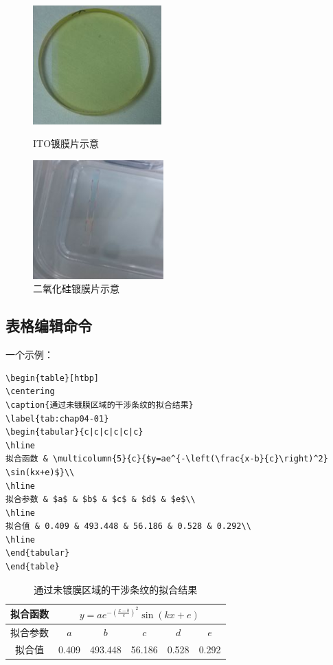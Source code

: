 \documentclass[onecolumn,a4paper,10pt]{article}
\begin{document}
\begin{figure}[htbp]
\begin{minipage}[t]{0.5\linewidth}
\centering
\includegraphics[height=1.8in]{pict04-01}
\caption{ITO镀膜片示意}
\label{fig:pict04-01}
\end{minipage}%
\begin{minipage}[t]{0.5\linewidth}
\centering
\includegraphics[height=1.8in]{pict04-02}
\caption{二氧化硅镀膜片示意}
\label{fig:pict04-02}
\end{minipage}
\end{figure}

\subsection{表格编辑命令}
一个示例：
\begin{verbatim}
\begin{table}[htbp]
\centering
\caption{通过未镀膜区域的干涉条纹的拟合结果}
\label{tab:chap04-01}
\begin{tabular}{c|c|c|c|c|c}
\hline
拟合函数 & \multicolumn{5}{c}{$y=ae^{-\left(\frac{x-b}{c}\right)^2} \sin(kx+e)$}\\
\hline
拟合参数 & $a$ & $b$ & $c$ & $d$ & $e$\\
\hline
拟合值 & 0.409 & 493.448 & 56.186 & 0.528 & 0.292\\
\hline
\end{tabular}
\end{table}
\end{verbatim}

\begin{table}[htbp]
\centering
\caption{通过未镀膜区域的干涉条纹的拟合结果}
\label{tab:chap04-01}
\begin{tabular}{c|c|c|c|c|c}
\hline
拟合函数 & \multicolumn{5}{c}{$y=ae^{-\left(\frac{x-b}{c}\right)^2} \sin(kx+e)$}\\
\hline
拟合参数 & $a$ & $b$ & $c$ & $d$ & $e$\\
\hline
拟合值 & 0.409 & 493.448 & 56.186 & 0.528 & 0.292\\
\hline
\end{tabular}
\end{table}
\end{document}
